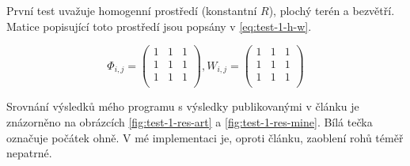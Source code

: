 \documentclass[11pt,a4paper]{scrartcl}
\begin{document}
	První test uvažuje homogenní prostředí (konstantní $R$), plochý terén a bezvětří. Matice popisující toto prostředí jsou popsány v \ref{eq:test-1-h-w}.
	
	\begin{equation}
	\Phi_{i,j} =
	\begin{pmatrix}
	1       & 1 & 1 \\
	1       & 1 & 1 \\
	1       & 1 & 1 \\
	\end{pmatrix}, 
	W_{i,j} = 
	\begin{pmatrix}
		1       & 1 & 1 \\
	1       & 1 & 1 \\
	1       & 1 & 1 \\	
	\end{pmatrix}
	\label{eq:test-1-h-w}
	\end{equation}
	
	Srovnání výsledků mého programu s výsledky publikovanými v článku je znázorněno na obrázcích \ref{fig:test-1-res-art} a \ref{fig:test-1-res-mine}. Bílá tečka označuje počátek ohně. V mé implementaci je, oproti článku, zaoblení rohů téměř nepatrné.
	
\end{document}
